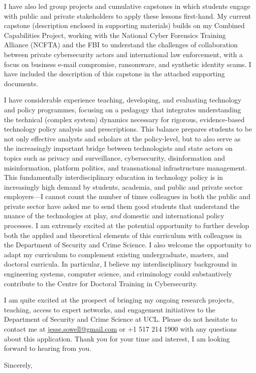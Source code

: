\documentclass[11pt]{letter}
\begin{document}
\begin{letter}
I have also led group projects and cumulative capstones in which students engage with public and private stakeholders to apply these lessons first-hand.
%
My current capstone (description enclosed in supporting materials) builds on my Combined Capabilities Project, working with the National Cyber Forensics Training Alliance (NCFTA) and the FBI to understand the challenges of collaboration between private cybersecurity actors and international law enforcement, with a focus on business e-mail compromise, ransomware, and synthetic identity scams.  I have included the description of this capstone in the attached supporting documents.


I have considerable experience teaching, developing, and evaluating technology and policy programmes, focusing on a pedagogy that integrates understanding the technical (complex system) dynamics necessary for rigorous, evidence-based technology policy analysis and prescriptions.
%
This balance prepares students to be not only effective analysts and scholars at the policy-level, but to also serve as the increasingly important bridge between technologists and state actors on topics such as privacy and surveillance, cybersecurity, disinformation and misinformation, platform politics, and transnational infrastructure management.
%
This fundamentally interdisciplinary education in technology policy is in increasingly high demand by students, academia, and public and private sector employers---I cannot count the number of times colleagues in both the public and private sector have asked me to send them good students that understand the nuance of the technologies at play, \emph{and} domestic and international policy processes.
%
I am extremely excited at the potential opportunity to further develop both the applied and theoretical elements of this curriculum with colleagues in the Department of Security and Crime Science.
%
I also welcome the opportunity to adapt my curriculum to complement existing undergraduate, masters, and doctoral curricula.
%
In particular, I believe my interdisciplinary background in engineering systems, computer science, and criminology could substantively contribute to the Centre for Doctoral Training in Cybersecurity. 
%


%
I am quite excited at the prospect of bringing my ongoing research projects, teaching, access to expert networks, and engagement initiatives to the Department of Security and Crime Science at UCL.
%
Please do not hesitate to contact me at \href{mailto:jesse.sowell@gmail.com}{jesse.sowell@gmail.com} or +1 517 214 1900 with any questions about this application.
%
Thank you for your time and interest, I am looking forward to hearing from you.

\vspace{\baselineskip}



\closing{Sincerely,}




\end{letter}
\end{document}
